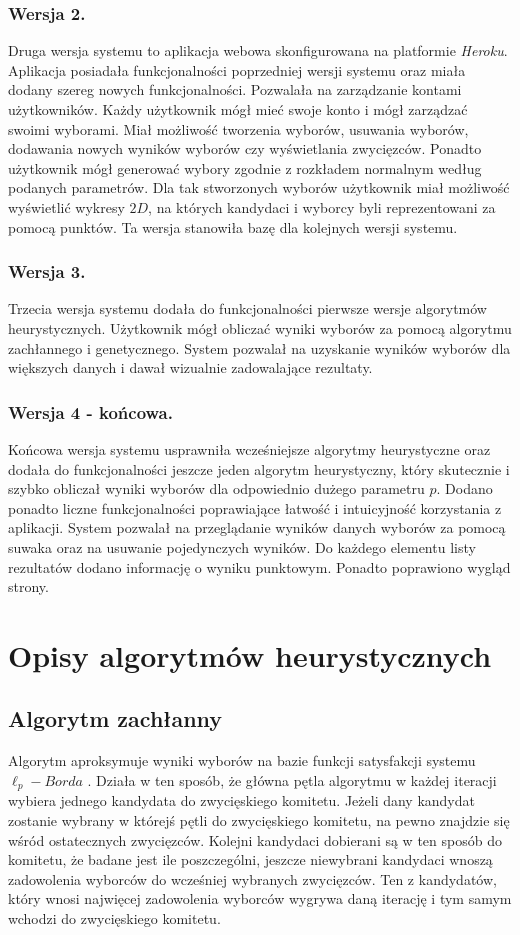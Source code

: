 \documentclass[polish,11pt]{aghthesis}
\begin{document}
\subsubsection{Wersja 2.}
Druga wersja systemu to aplikacja webowa skonfigurowana na platformie \textit{Heroku}. Aplikacja
posiadała funkcjonalności poprzedniej wersji systemu oraz miała dodany szereg nowych
funkcjonalności. Pozwalała na zarządzanie kontami użytkowników. Każdy użytkownik mógł
mieć swoje konto i mógł zarządzać swoimi wyborami. Miał możliwość tworzenia wyborów,
usuwania wyborów, dodawania nowych wyników wyborów czy wyświetlania zwycięzców.
Ponadto użytkownik mógł generować wybory zgodnie z rozkładem normalnym według
podanych parametrów. Dla tak stworzonych wyborów użytkownik miał możliwość wyświetlić
wykresy $2D$, na których kandydaci i wyborcy byli reprezentowani za pomocą punktów. Ta
wersja stanowiła bazę dla kolejnych wersji systemu.

\subsubsection{Wersja 3.}
Trzecia wersja systemu dodała do funkcjonalności pierwsze wersje algorytmów
heurystycznych. Użytkownik mógł obliczać wyniki wyborów za pomocą algorytmu
zachłannego i genetycznego. System pozwalał na uzyskanie wyników wyborów dla
większych danych i dawał wizualnie zadowalające rezultaty.

\subsubsection{Wersja 4 - końcowa.}
Końcowa wersja systemu usprawniła wcześniejsze algorytmy heurystyczne oraz dodała do
funkcjonalności jeszcze jeden algorytm heurystyczny, który skutecznie i szybko obliczał
wyniki wyborów dla odpowiednio dużego parametru $p$. Dodano ponadto liczne
funkcjonalności poprawiające łatwość i intuicyjność korzystania z aplikacji. System pozwalał
na przeglądanie wyników danych wyborów za pomocą suwaka oraz na usuwanie
pojedynczych wyników. Do każdego elementu listy rezultatów dodano informację o wyniku
punktowym. Ponadto poprawiono wygląd strony.

\section{Opisy algorytmów heurystycznych}
\subsection{Algorytm zachłanny}
Algorytm aproksymuje wyniki wyborów na bazie funkcji satysfakcji systemu $\ell_p-Borda$ .
Działa w ten sposób, że główna pętla algorytmu w każdej iteracji wybiera jednego kandydata
do zwycięskiego komitetu. Jeżeli dany kandydat zostanie wybrany w którejś pętli do
zwycięskiego komitetu, na pewno znajdzie się wśród ostatecznych zwycięzców. Kolejni
kandydaci dobierani są w ten sposób do komitetu, że badane jest ile poszczególni, jeszcze
niewybrani kandydaci wnoszą zadowolenia wyborców do wcześniej wybranych zwycięzców.
Ten z kandydatów, który wnosi najwięcej zadowolenia wyborców wygrywa daną iterację i
tym samym wchodzi do zwycięskiego komitetu. 
\end{document}
